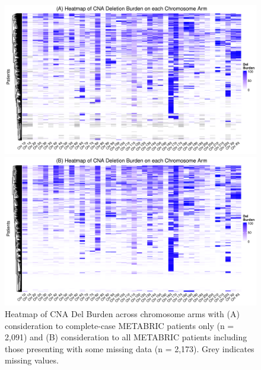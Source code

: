 \begin{figure}[!ht]
  \centering
  
  \vspace{0.8cm}
  
    \includegraphics[width = 1.05\textwidth]{../figures/Chapter_2/CNA_Del_Burden_Heatmap_CCA.png}
    
  \vspace{1.5cm}
   
  \includegraphics[width = 1.05\textwidth]{../figures/Chapter_2/CNA_Del_Burden_Heatmap_All.png}
  
  \vspace{0.8cm}
  
   \caption[Heatmap of CNA Del Burden across chromosome arms.]{Heatmap of CNA Del Burden across chromosome arms with (A) consideration to complete-case METABRIC patients only (n = 2,091) and (B) consideration to all METABRIC patients including those presenting with some missing data (n = 2,173). Grey indicates missing values.}
  \label{SurvTrees_Burden_HM}
\end{figure}

